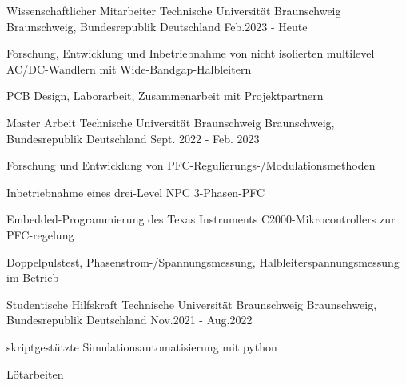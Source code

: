 

\begin{cventries}

  \cventry
  {Wissenschaftlicher Mitarbeiter} %
  {Technische Universität Braunschweig} %
  {Braunschweig, Bundesrepublik Deutschland} %
  {Feb.2023 - Heute} %
  {
    \begin{cvitems} %
      \item {Forschung, Entwicklung und Inbetriebnahme von nicht isolierten multilevel AC/DC-Wandlern mit Wide-Bandgap-Halbleitern}
      \item {PCB Design, Laborarbeit, Zusammenarbeit mit Projektpartnern}
    \end{cvitems}
  }
  \cventry
  {Master Arbeit} %
  {Technische Universität Braunschweig} %
  {Braunschweig, Bundesrepublik Deutschland} %
  {Sept. 2022 - Feb. 2023} %
  {
    \begin{cvitems} %
      \item {Forschung und Entwicklung von PFC-Regulierungs-/Modulationsmethoden}
      \item {Inbetriebnahme eines drei-Level NPC 3-Phasen-PFC}
      \item {Embedded-Programmierung des Texas Instruments C2000-Mikrocontrollers zur PFC-regelung}
      \item {Doppelpulstest, Phasenstrom-/Spannungsmessung, Halbleiterspannungsmessung im Betrieb}
    \end{cvitems}
  }
  \cventry
  {Studentische Hilfskraft} %
  {Technische Universität Braunschweig} %
  {Braunschweig, Bundesrepublik Deutschland} %
  {Nov.2021 - Aug.2022} %
  {
    \begin{cvitems} %
      \item {skriptgestützte Simulationsautomatisierung mit python}
      \item {Lötarbeiten}
    \end{cvitems}
  }


\end{cventries}

